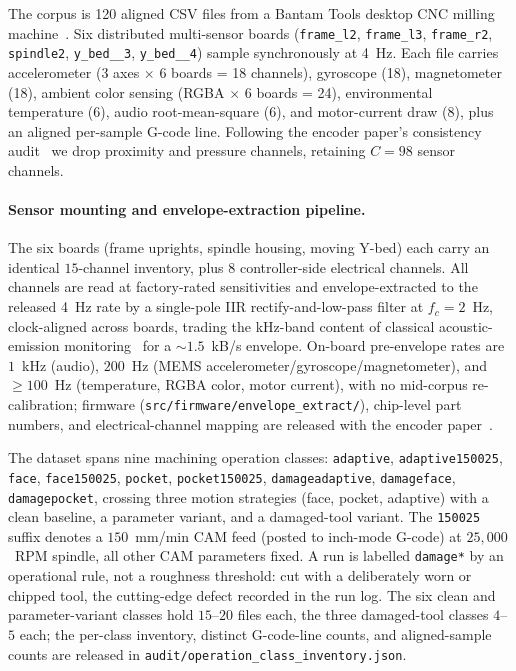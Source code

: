 \documentclass[sensors,article,submit,moreauthors,pdftex]{Definitions/mdpi}
\begin{document}
The corpus is 120 aligned CSV files from a Bantam Tools desktop CNC milling machine~\cite{encoder_paper}. Six distributed multi-sensor boards (\texttt{frame\_l2}, \texttt{frame\_l3}, \texttt{frame\_r2}, \texttt{spindle2}, \texttt{y\_bed\_\_3}, \texttt{y\_bed\_\_4}) sample synchronously at 4~Hz. Each file carries accelerometer (3 axes $\times$ 6 boards = 18 channels), gyroscope (18), magnetometer (18), ambient color sensing (RGBA $\times$ 6 boards = 24), environmental temperature (6), audio root-mean-square (6), and motor-current draw (8), plus an aligned per-sample G-code line. Following the encoder paper's consistency audit~\cite{encoder_paper} we drop proximity and pressure channels, retaining $C=98$ sensor channels.

\paragraph{Sensor mounting and envelope-extraction pipeline.} The six boards (frame uprights, spindle housing, moving Y-bed) each carry an identical $15$-channel inventory, plus 8 controller-side electrical channels. All channels are read at factory-rated sensitivities and envelope-extracted to the released 4~Hz rate by a single-pole IIR rectify-and-low-pass filter at $f_c\!=\!2$~Hz, clock-aligned across boards, trading the kHz-band content of classical acoustic-emission monitoring~\cite{teti2010advanced} for a $\sim 1.5$~kB/s envelope. On-board pre-envelope rates are $1$~kHz (audio), $200$~Hz (MEMS accelerometer/gyroscope/magnetometer), and $\geq\!100$~Hz (temperature, RGBA color, motor current), with no mid-corpus re-calibration; firmware (\texttt{src/firmware/envelope\_extract/}), chip-level part numbers, and electrical-channel mapping are released with the encoder paper~\cite{encoder_paper}.

The dataset spans nine machining operation classes: \texttt{adaptive}, \texttt{adaptive150025}, \texttt{face}, \texttt{face150025}, \texttt{pocket}, \texttt{pocket150025}, \texttt{damageadaptive}, \texttt{damageface}, \texttt{damagepocket}, crossing three motion strategies (face, pocket, adaptive) with a clean baseline, a parameter variant, and a damaged-tool variant. The \texttt{150025} suffix denotes a $150$~mm/min CAM feed (posted to inch-mode G-code) at $25{,}000$~RPM spindle, all other CAM parameters fixed. A run is labelled \texttt{damage*} by an operational rule, not a roughness threshold: cut with a deliberately worn or chipped tool, the cutting-edge defect recorded in the run log. The six clean and parameter-variant classes hold $15$--$20$ files each, the three damaged-tool classes $4$--$5$ each; the per-class inventory, distinct G-code-line counts, and aligned-sample counts are released in \texttt{audit/operation\_class\_inventory.json}.
\end{document}
